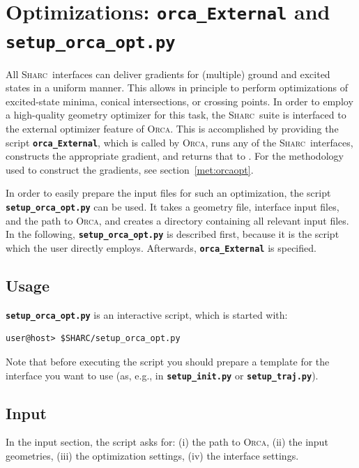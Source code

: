 \documentclass[a4paper,10pt,DIV=15,openany]{scrbook}
\newcommand{\sharc}{\textsc{Sharc}}
\newcommand{\ttt}[1]{\textbf{\texttt{#1}}}
\begin{document}

\section{Optimizations: \ttt{orca\_External} and \ttt{setup\_orca\_opt.py}}\label{sec:Orca_External}

All \sharc\ interfaces can deliver gradients for (multiple) ground and excited states in a uniform manner.
This allows in principle to perform optimizations of excited-state minima, conical intersections, or crossing points.
In order to employ a high-quality geometry optimizer for this task, the \sharc\ suite is interfaced to the external optimizer feature of \textsc{Orca}.
This is accomplished by providing the script \ttt{orca\_External}, which is called by \textsc{Orca}, runs any of the \sharc\ interfaces, constructs the appropriate gradient, and returns that to .
For the methodology used to construct the gradients, see section~\ref{met:orcaopt}.

In order to easily prepare the input files for such an optimization, the script \ttt{setup\_orca\_opt.py} can be used.
It takes a geometry file, interface input files, and the path to \textsc{Orca}, and creates a directory containing all relevant input files.
In the following, \ttt{setup\_orca\_opt.py} is described first, because it is the script which the user directly employs. Afterwards, \ttt{orca\_External} is specified.

\subsection{Usage}

\ttt{setup\_orca\_opt.py} is an interactive script, which is started with:
\begin{verbatim}
user@host> $SHARC/setup_orca_opt.py
\end{verbatim}
Note that before executing the script you should prepare a template for the interface you want to use (as, e.g., in \ttt{setup\_init.py} or \ttt{setup\_traj.py}).

\subsection{Input}

In the input section, the script asks for: (i) the path to \textsc{Orca}, (ii) the input geometries, (iii) the optimization settings, (iv) the interface settings.
\end{document}

